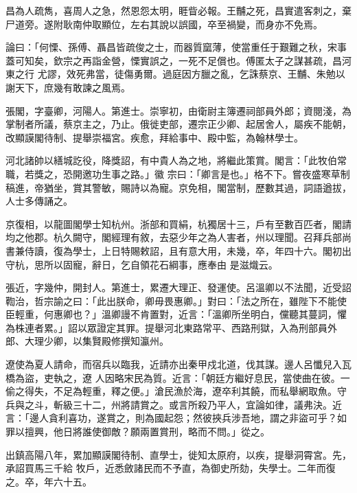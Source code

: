 \begin{pinyinscope}
 昌為人疏雋，喜周人之急，然恩怨太明，睚眥必報。王黼之死，昌實遣客刺之，棄尸道旁。遂附耿南仲取顯位，左右其說以誤國，卒至禍變，而身亦不免焉。



 論曰：「何慄、孫傅、聶昌皆疏俊之士，而器質窳薄，使當重任于艱難之秋，宋事蓋可知矣，欽宗之再詣金營，慄實誤之，一死不足償也。傅匿太子之謀甚疏，昌河東之行
 尤謬，效死弗當，徒傷勇爾。過庭因方臘之亂，乞誅蔡京、王黼、朱勉以謝天下，庶幾有敢諫之風焉。



 張閣，字臺卿，河陽人。第進士。崇寧初，由衛尉主簿遷祠部員外郎；資閱淺，為掌制者所議，蔡京主之，乃止。俄徙吏部，遷宗正少卿、起居舍人，屬疾不能朝，改顯謨閣待制、提舉崇福宮。疾愈，拜給事中、殿中監，為翰林學士。



 河北諸帥以繕城訖役，降獎詔，有中貴人為之地，將繼此策賞。閣言：「此牧伯常職，若獎之，恐開邀功生事之路。」徽
 宗曰：「卿言是也。」格不下。嘗夜盛寒草制稿進，帝猶坐，賞其警敏，賜詩以為寵。京免相，閣當制，歷數其過，詞語遒拔，人士多傳誦之。



 京復相，以龍圖閣學士知杭州。浙部和買絹，杭獨居十三，戶有至數百匹者，閣請均之他郡。杭久闕守，閣經理有敘，去惡少年之為人害者，州以理聞。召拜兵部尚書兼侍讀，復為學士，上日特賜敕詔，且有意大用，未幾，卒，年四十六。閣初出守杭，思所以固寵，辭日，乞自領花石綱事，應奉由
 是滋熾云。



 張近，字幾仲，開封人。第進士，累遷大理正、發運使。呂溫卿以不法聞，近受詔鞫治，哲宗諭之曰：「此出朕命，卿毋畏惠卿。」對曰：「法之所在，雖陛下不能使臣輕重，何惠卿也？」溫卿謾不肯置對，近言：「溫卿所坐明白，儻聽其蔓詞，懼為株連者累。」詔以眾證定其罪。提舉河北東路常平、西路刑獄，入為刑部員外郎、大理少卿，以集賢殿修撰知瀛州。



 遼使為夏人請命，而宿兵以臨我，近請亦出秦甲戍北道，伐其謀。邊人呂懺兒入瓦橋為盜，吏執之，遼
 人因略宋民為質。近言：「朝廷方繼好息民，當使曲在彼。一偷之得失，不足為輕重，釋之便。」滄民漁於海，遼卒利其饒，而私舉網取魚。守兵與之斗，斬級三十二，州將請賞之。或言所殺乃平人，宜論如律，議弗決。近言：「邊人貪利喜功，遂賞之，則為國起怨；然彼挾兵涉吾地，謂之非盜可乎？如罪以擅興，他日將誰使御敵？願兩置賞刑，略而不問。」從之。



 出鎮高陽八年，累加顯謨閣待制、直學士，徙知太原府，以疾，提舉洞霄宮。先，承詔買馬三千給
 牧戶，近悉斂諸民而不予直，為御史所劾，失學士。二年而復之。卒，年六十五。




\end{pinyinscope}
